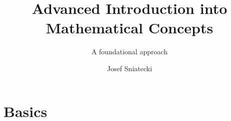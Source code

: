 \documentclass[12pt,twoside]{scrbook}
\title{Advanced Introduction into Mathematical Concepts}
\subtitle{A foundational approach}
\author{Josef Sniatecki}
\numberwithin{equation}{section}
\begin{document}
\maketitle
\tableofcontents
\newpage


\chapter{Basics}







\end{document}
